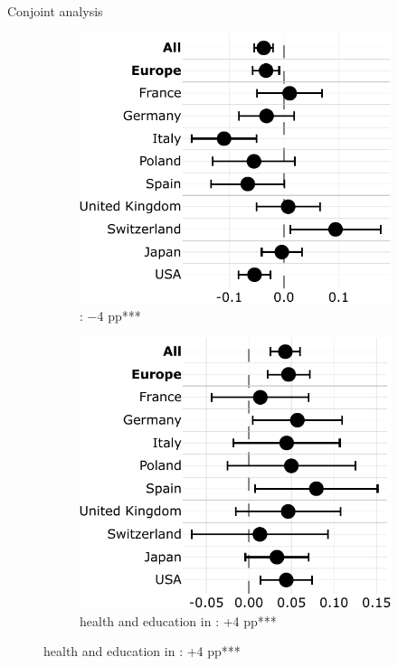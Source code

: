 \documentclass[aspectratio=169,xcolor=dvipsnames, 11pt,mathserif]{beamer}
\begin{document}
\begin{frame}{Conjoint analysis} 
    \begin{figure}
\caption{ the  political  of containing the following policy%
} \vspace{-.4cm}
\begin{subfigure}{.48\textwidth}
  \caption[]{: $-$4 pp*** }\vspace{-.3cm}
  \includegraphics[width=\textwidth]{../figures/country_comparison/program_preferred_by_cut_aid_in_program.pdf}
\end{subfigure} \pause
\begin{subfigure}{.50\textwidth}
  \caption[]{ health and education in : +4 pp*** %
  } \vspace{-.3cm}
  \includegraphics[width=.95\textwidth]{../figures/country_comparison/program_preferred_by_millionaire_tax_in_program.pdf}

\end{subfigure}
\end{figure}
\end{frame}
\end{document}
